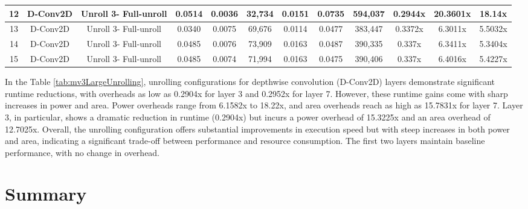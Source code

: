 \begin{table}[htbp]
{\begin{tabular}{|c|c|c|c|c|c|c|c|c|c|c|c|}
12 & D-Conv2D & Unroll 3- Full-unroll & 0.0514 & 0.0036 & 32,734 & 0.0151 & 0.0735 & 594,037 & 0.2944x & 20.3601x & 18.14x \\ \hline
13 & D-Conv2D & Unroll 3- Full-unroll & 0.0340 & 0.0075 & 69,676 & 0.0114 & 0.0477 & 383,447 & 0.3372x & 6.3011x & 5.5032x \\ \hline
14 & D-Conv2D & Unroll 3- Full-unroll & 0.0485 & 0.0076 & 73,909 & 0.0163 & 0.0487 & 390,335 & 0.337x & 6.3411x & 5.3404x \\ \hline
15 & D-Conv2D & Unroll 3- Full-unroll & 0.0485 & 0.0074 & 71,994 & 0.0163 & 0.0475 & 390,406 & 0.337x & 6.4016x & 5.4227x \\ \hline

\end{tabular}
}
\end{table}

In the Table \ref{tab:mv3LargeUnrolling}, unrolling configurations for depthwise convolution (D-Conv2D) layers demonstrate significant runtime reductions, with overheads as low as 0.2904x for layer 3 and 0.2952x for layer 7. However, these runtime gains come with sharp increases in power and area. Power overheads range from 6.1582x to 18.22x, and area overheads reach as high as 15.7831x for layer 7. Layer 3, in particular, shows a dramatic reduction in runtime (0.2904x) but incurs a power overhead of 15.3225x and an area overhead of 12.7025x. Overall, the unrolling configuration offers substantial improvements in execution speed but with steep increases in both power and area, indicating a significant trade-off between performance and resource consumption. The first two layers maintain baseline performance, with no change in overhead.


\section{Summary}

